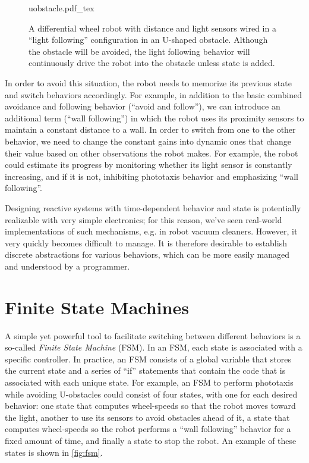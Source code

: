 \begin{figure}
\centering
    \def\svgwidth{0.64\textwidth}
    {uobstacle.pdf_tex}
    \caption{\label{fig:uobstacle}A differential wheel robot with distance and light sensors wired in a ``light following'' configuration in an U-shaped obstacle. Although the obstacle will be avoided, the light following behavior will continuously drive the robot into the obstacle unless state is added.}
\end{figure}

In order to avoid this situation, the robot needs to memorize its previous state and switch behaviors accordingly. For example, in addition to the basic combined avoidance and following behavior (``avoid and follow''), we can introduce an additional term (``wall following'') in which the robot uses its proximity sensors to maintain a constant distance to a wall. In order to switch from one to the other behavior, we need to change the constant gains into dynamic ones that change their value based on other observations the robot makes. For example, the robot could estimate its progress by monitoring whether its light sensor is constantly increasing, and if it is not, inhibiting phototaxis behavior and emphasizing ``wall following''.

Designing reactive systems with time-dependent behavior and state is potentially realizable with very simple electronics; for this reason, we've seen real-world implementations of such mechanisms, e.g. in robot vacuum cleaners.
However, it very quickly becomes difficult to manage. It is therefore desirable to establish discrete abstractions for various behaviors, which can be more easily managed and understood by a programmer.

\section{Finite State Machines}\label{sec:fsm}

A simple yet powerful tool to facilitate switching between different behaviors is a so-called \textsl{Finite State Machine} (FSM). In an FSM, each state is associated with a specific controller. In practice, an FSM consists of a global variable that stores the current state and a series of ``if'' statements that contain the code that is associated with each unique state. For example, an FSM to perform phototaxis while avoiding U-obstacles could consist of four states, with one for each desired behavior: one state that computes wheel-speeds so that the robot moves toward the light, another to use its sensors to avoid obstacles ahead of it, a state that computes wheel-speeds so the robot performs a ``wall following'' behavior for a fixed amount of time, and finally a state to stop the robot. An example of these states is shown in \cref{fig:fsm}.

